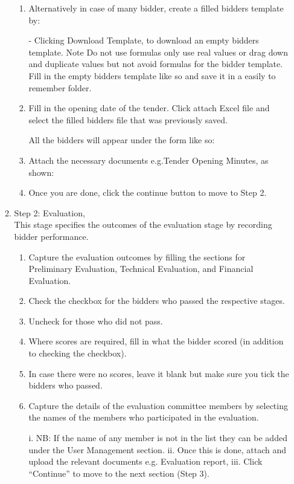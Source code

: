 \documentclass [12pt]{book}
\begin{document}
\begin{enumerate}
\begin{enumerate}
\begin{enumerate}
    \item Alternatively in case of many bidder, create a filled bidders template by:

       - Clicking Download Template, to download an empty bidders template. 
    Note Do not use formulas only use real values or drag down and duplicate values but not avoid formulas for the bidder template.
    Fill in the empty bidders template like so and save it in a easily to remember folder.

    \item Fill in the opening date of the tender.
    Click attach Excel file and select the filled bidders file that was previously saved.
    
    All the bidders will appear under the form like so:
    \item Attach the necessary documents e.g.Tender Opening Minutes, as shown: 
    
    \item Once you are done, click the continue button to move to Step 2. 
\end{enumerate}

\item {Step 2: Evaluation}, \\
This stage specifies the outcomes of the evaluation stage by recording bidder performance.

\begin{enumerate}
    \item Capture the evaluation outcomes by filling the sections for Preliminary Evaluation, Technical Evaluation, and Financial Evaluation.
    
    \item Check the checkbox for the bidders who passed the respective stages.
    \item Uncheck for those who did not pass.
    \item Where scores are required, fill in what the bidder scored (in addition to checking the checkbox).
    \item In case there were no scores, leave it blank but make sure you tick the bidders who passed.
\item Capture the details of the evaluation committee members by selecting the names of the members who participated in the evaluation.
 
i.	NB: If the name of any member is not in the list they can be added under the User Management section.
ii.	Once this is done, attach and upload the relevant documents e.g. Evaluation report,
iii.	Click “Continue” to move to the next section (Step 3).
\end{enumerate}



\end{enumerate}
\end{enumerate}
\end{document}
